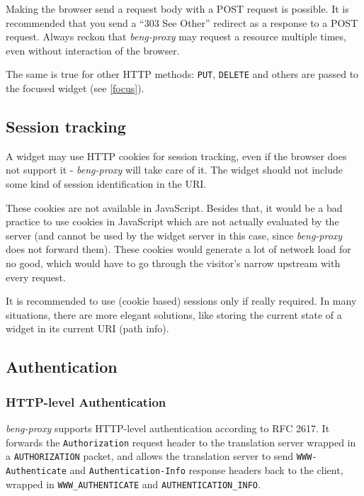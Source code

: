 \documentclass[a4paper,12pt]{article}
\begin{document}
Making the browser send a request body with a POST request is
possible.  It is recommended that you send a ``303 See Other''
redirect as a response to a POST request.  Always reckon that
\emph{beng-proxy} may request a resource multiple times, even without
interaction of the browser.

The same is true for other HTTP methods: \texttt{PUT}, \texttt{DELETE}
and others are passed to the focused widget (see \ref{focus}).

\subsection{Session tracking}

A widget may use HTTP cookies for session tracking, even if the
browser does not support it - \emph{beng-proxy} will take care of it.
The widget should not include some kind of session identification in
the URI.

These cookies are not available in JavaScript.  Besides that, it would
be a bad practice to use cookies in JavaScript which are not actually
evaluated by the server (and cannot be used by the widget server in
this case, since \emph{beng-proxy} does not forward them).  These
cookies would generate a lot of network load for no good, which would
have to go through the visitor's narrow upstream with every request.

It is recommended to use (cookie based) sessions only if really
required.  In many situations, there are more elegant solutions, like
storing the current state of a widget in its current URI (path info).

\subsection{Authentication}
\label{authentication}

\subsubsection{HTTP-level Authentication}

\emph{beng-proxy} supports HTTP-level authentication according to RFC
2617.  It forwards the \texttt{Authorization} request header to the
translation server wrapped in a \verb|AUTHORIZATION| packet, and
allows the translation server to send \texttt{WWW-Authenticate} and
\texttt{Authentication-Info} response headers back to the client,
wrapped in \verb|WWW_AUTHENTICATE| and \verb|AUTHENTICATION_INFO|.
\end{document}

